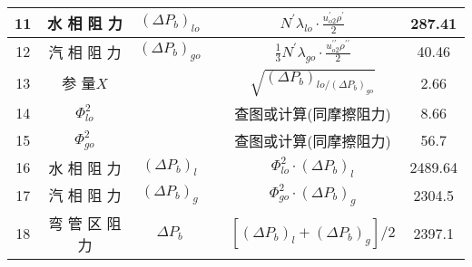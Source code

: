 \begin{table}[H]
{\begin{tabular}{|c|c|c|c|c|c|}
            11   & 水 相 阻 力          & $ (\Delta P_b)_{lo} $ &       & $ N^{\prime} \lambda_{l o} \cdot \frac{u_{o 2}^{\prime} \rho^{\prime}}{2} $                           & 287.41  \\ \hline
            12   & 汽 相 阻 力          & $ (\Delta P_b)_{go} $ &       & $ \frac{1}{3} N^{\prime} \lambda_{g o} \cdot \frac{u_{o 2}^{\prime \prime} \rho^{\prime \prime}}{2} $ & 40.46   \\ \hline
            13   & 参 量$ X $           &                       &       & $ \sqrt{(\Delta P_b)_{lo / (\Delta P_b)_{go}}} $                                                      & 2.66    \\ \hline
            14   & $ \Phi_{lo}^{2} $    &                       &       & 查图或计算(同摩擦阻力)                                                                                & 8.66    \\ \hline
            15   & $ \Phi_{go}^{2} $    &                       &       & 查图或计算(同摩擦阻力)                                                                                & 56.7    \\ \hline
            16   & 水 相 阻 力          & $ (\Delta P_b)_{l} $  &       & $ \Phi_{lo}^{2} \cdot (\Delta P_b)_{l} $                                                              & 2489.64 \\ \hline
            17   & 汽 相 阻 力          & $ (\Delta P_b)_{g} $  &       & $ \Phi_{go}^{2} \cdot (\Delta P_b)_{g} $                                                              & 2304.5  \\ \hline
            18   & 弯 管 区 阻 力       & $ \Delta P_b $        &       & $ [(\Delta P_b)_{l} + (\Delta P_b)_{g}] / 2 $                                                         & 2397.1  \\ \hline
        \end{tabular}
    }
\end{table}

